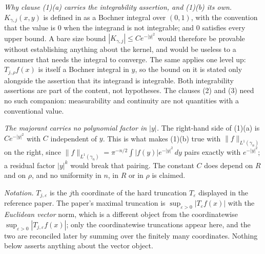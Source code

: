 \begin{lemma}
\emph{Why clause (1)(a) carries the integrability assertion, and (1)(b) its
own.}  $K_{\gamma,j}(x,y)$ is defined in  as a
Bochner integral over $(0,1)$, with the convention that the value is $0$ when
the integrand is not integrable; and $0$ satisfies every upper bound.  A bare
size bound $|K_{\gamma,j}| \leq Ce^{-|y|^2}$ would therefore be provable
without establishing anything about the kernel, and would be useless to a
consumer that needs the integral to converge.  The same applies one level up:
$T_{j,\rho}f(x)$ is itself a Bochner integral in $y$, so the bound on it is
stated only alongside the assertion that its integrand is integrable.  Both
integrability assertions are part of the content, not hypotheses.  The clauses
(2) and (3) need no such companion: measurability and continuity are not
quantities with a conventional value.

\emph{The majorant carries no polynomial factor in $|y|$.}  The right-hand side
of (1)(a) is $Ce^{-|y|^2}$ with $C$ independent of $y$.  This is what makes
(1)(b) true with $\|f\|_{L^1(\gamma_n)}$ on the right, since
$\|f\|_{L^1(\gamma_n)} = \pi^{-n/2}\int|f(y)|e^{-|y|^2}\,dy$ pairs exactly with
$e^{-|y|^2}$; a residual factor $|y|^k$ would break that pairing.  The constant
$C$ does depend on $R$ and on $\rho$, and no uniformity in $n$, in $R$ or in
$\rho$ is claimed.

\emph{Notation.}  $T_{j,\varepsilon}$ is the $j$th coordinate of the hard
truncation $T_\varepsilon$ displayed in the reference paper.  The paper's
maximal truncation is $\sup_{\varepsilon>0}|T_\varepsilon f(x)|$ with the
\emph{Euclidean vector} norm, which is a different object from the
coordinatewise $\sup_{\varepsilon>0}|T_{j,\varepsilon}f(x)|$; only the
coordinatewise truncations appear here, and the two are reconciled later by
summing over the finitely many coordinates.  Nothing below asserts anything
about the vector object.
\end{lemma}
